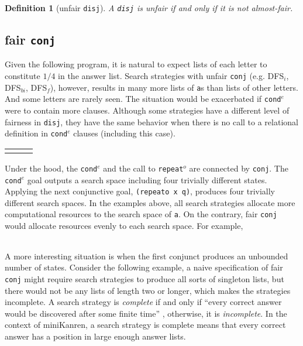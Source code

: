 \documentclass[format=acmlarge, review=true, authordraft=true]{acmart}
\newcommand{\conde}{\texttt{cond$^e$}}
\newcommand{\conj}{\texttt{conj}}
\newcommand{\disj}{\texttt{disj}}
\newcommand{\repeato}{\texttt{repeat$^o$}}
\newcommand{\DFSi }[0]{DFS$_{i}$}
\newcommand{\DFSf }[0]{DFS$_{f}$}
\newcommand{\DFSbi}[0]{DFS$_{bi}$}
\newtheorem{defn}{Definition}[section]
\begin{document}
\begin{defn}[unfair \disj{}]
A \disj{} is unfair if and only if it is not almost-fair.
\end{defn}

\subsection{fair \texttt{conj}}
\label{sec:fairconj}

Given the following program, it is natural to expect lists of each letter to
constitute $1/4$ in the answer list. Search strategies with unfair \conj{} 
(e.g. 
\DFSi, \DFSbi, \DFSf), however, results in many more lists of \texttt{a}s than 
lists of other letters. And some letters are rarely seen. The situation would 
be exacerbated if \conde{} were to contain more clauses.
Although some strategies have a different level of fairness in \disj{}, they 
have the same behavior when there is no call to a relational definition in 
\conde{} clauses (including this case).

\begin{center}
\begin{tabular}{l|c|r}
     &
     &
     \\
\end{tabular}
\end{center}

Under the hood, the \conde{} and the call to \repeato{} are connected by 
\conj{}. The \conde{} goal outputs a search space including four trivially 
different states. 
Applying the next conjunctive goal, \texttt{(repeato x q)}, produces four 
trivially different search spaces.
In the examples above, all search strategies allocate more computational 
resources to the search space of \texttt{a}. On the contrary, fair \conj{} 
would allocate resources evenly to each search space. For example,

\begin{center}
	\begin{tabular}{c}
		
	\end{tabular}
\end{center}

A more interesting situation is when the first conjunct produces an unbounded
number of states. Consider the following example, a naive specification of 
fair \conj{} 
might require search strategies to produce all sorts of singleton lists, but 
there
would not be any lists of length two or longer, which makes the strategies 
incomplete. 
A search strategy is \emph{complete} if and only if ``every correct answer 
would be discovered after some finite time'' \cite{seres1999algebra}, 
otherwise, it is \emph{incomplete}. In the 
context of miniKanren, a search strategy is complete means that every correct 
answer has a position in large enough answer lists.
\end{document}
